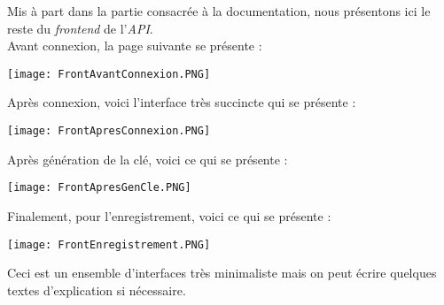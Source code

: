 Mis à part dans la partie consacrée à la documentation, nous présentons ici le reste du \textit{frontend} de l'\textit{API}.\\
Avant connexion, la page suivante se présente :
\begin{center}
\texttt{[image: FrontAvantConnexion.PNG]}
\end{center}
Après connexion, voici l'interface très succincte qui se présente :
\begin{center}
\texttt{[image: FrontApresConnexion.PNG]}
\end{center}
Après génération de la clé, voici ce qui se présente :
\begin{center}
\texttt{[image: FrontApresGenCle.PNG]}
\end{center}
Finalement, pour l'enregistrement, voici ce qui se présente :
\begin{center}
\texttt{[image: FrontEnregistrement.PNG]}
\end{center}
Ceci est un ensemble d'interfaces très minimaliste mais on peut écrire quelques textes d'explication si nécessaire.